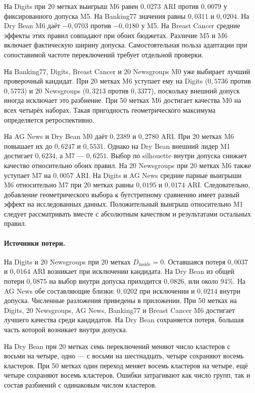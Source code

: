 На Digits при 20 метках выигрыш M6 равен $0{,}0273$ ARI против $0{,}0079$ у фиксированного допуска M5. На Banking77 значения равны $0{,}0311$ и $0{,}0204$. На Dry Bean M6 даёт $-0{,}0703$ против $-0{,}0180$ у M5. На Breast Cancer средние эффекты этих правил совпадают при обоих бюджетах. Различие M5 и M6 включает фактическую ширину допуска. Самостоятельная польза адаптации при сопоставимой частоте переключений требует отдельной проверки.

На Banking77, Digits, Breast Cancer и 20 Newsgroups M0 уже выбирает лучший проверочный кандидат. При 20 метках M6 уступает ему на Digits ($0{,}5736$ против $0{,}5773$) и 20 Newsgroups ($0{,}3213$ против $0{,}3377$), поскольку внешний допуск иногда исключает это разбиение. При 50 метках M6 достигает качества M0 на всех четырёх наборах. Такая пригодность геометрического максимума определяется ретроспективно.

На AG News и Dry Bean M0 даёт $0{,}2389$ и $0{,}2780$ ARI. При 20 метках M6 повышает их до $0{,}6247$ и $0{,}5531$. Однако на Dry Bean внешний лидер M1 достигает $0{,}6234$, а M7 --- $0{,}6251$. Выбор по silhouette внутри допуска снижает качество относительно обоих правил. На 20 Newsgroups при 20 метках M6 также уступает M7 на $0{,}0057$ ARI. На Digits и AG News средние парные выигрыши M6 относительно M7 при 20 метках равны $0{,}0195$ и $0{,}0174$ ARI. Следовательно, добавление геометрического выбора к бутстрепному сравнению имеет разный эффект на исследованных данных. Положительный выигрыш относительно M1 следует рассматривать вместе с абсолютным качеством и результатами остальных правил.

\paragraph{Источники потери.}
На Digits и 20 Newsgroups при 20 метках $D_{\mathrm{inside}}=0$. Оставшаяся потеря $0{,}0037$ и $0{,}0164$ ARI возникает при исключении кандидата. На Dry Bean из общей потери $0{,}0875$ на выбор внутри допуска приходится $0{,}0826$, или около 94\%. На AG News обе составляющие близки: $0{,}0202$ при исключении и $0{,}0214$ внутри допуска. Численные разложения приведены в приложении. При 50 метках на Digits, 20 Newsgroups, AG News, Banking77 и Breast Cancer M6 достигает лучшего качества среди кандидатов. На Dry Bean сохраняется потеря, большая часть которой возникает внутри допуска.

На Dry Bean при 20 метках семь переключений меняют число кластеров с восьми на четыре, одно --- с восьми на шестнадцать, четыре сохраняют восемь кластеров. При 50 метках один переход меняет восемь кластеров на четыре, ещё четыре сохраняют восемь кластеров. Ошибки затрагивают как число групп, так и состав разбиений с одинаковым числом кластеров.

